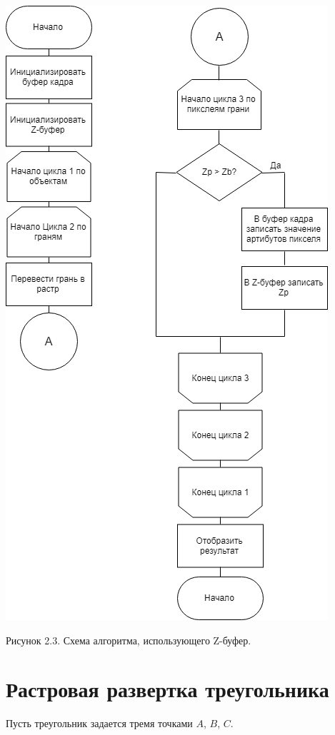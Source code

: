 \documentclass[12pt]{report}
\begin{document}
	\begin{center}
		\includegraphics[scale=0.5]{zbuffBS.png}
		
		Рисунок 2.3. Схема алгоритма, использующего Z-буфер.
	\end{center}

	\section{Растровая развертка треугольника}
	
	Пусть треугольник задается тремя точками $A$, $B$, $C$.
	
\end{document}
